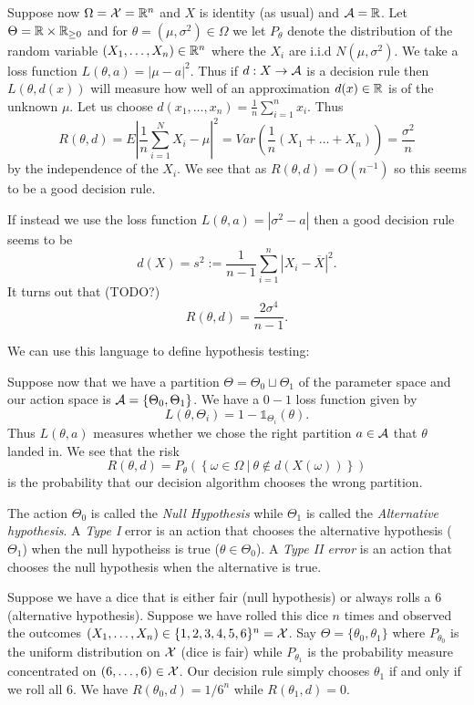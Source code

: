\documentclass[twoside, a4paper, 10pt]{amsart}
\begin{document}
\begin{eg} Suppose now $\Omega = \mathcal{X} = \mathbb{R}^n$ and $X$ is identity (as usual) and $\mathcal{A} = \mathbb{R}$. Let $\Theta = \mathbb{R} \times \mathbb{R}_{\geq 0}$ and for $\theta = (\mu, \sigma^2) \in \Omega$ we let $P_{\theta}$ denote the distribution of the random variable $(X_1, \ldots, X_n) \in \mathbb{R}^n$ where the $X_i$ are i.i.d $N(\mu, \sigma^2)$. We take a loss function $L(\theta, a) = |\mu - a|^2$. Thus if $d:X \to \mathcal{A}$ is a decision rule then $L(\theta, d(x))$ will measure how well of an approximation $d(x) \in \mathbb{R}$ is of the unknown $\mu$. Let us choose $d(x_1, \ldots, x_n) = \frac{1}{n} \sum_{i=1}^n x_i$. Thus $$R(\theta, d) = E |\frac{1}{n}\sum_{i=1}^N X_i - \mu|^2 = Var(\frac{1}{n}(X_1 + \ldots + X_n)) = \frac{\sigma^2}{n}$$ by the independence of the $X_i$. We see that as $R(\theta, d) = O(n^{-1})$ so this seems to be a good decision rule.

If instead we use the loss function $L(\theta, a) = |\sigma^2 - a|$ then a good decision rule seems to be $$d(X) = s^2 := \frac{1}{n-1} \sum_{i=1}^n |X_i - \overline{X}|^2.$$ It turns out that (TODO?) $$R(\theta, d) = \frac{2\sigma^4}{n-1}.$$

\end{eg} 

We can use this language to define hypothesis testing:

\begin{mydef}\label{def: intro hypothesis testing} Suppose now that we have a partition $\Theta = \Theta_0 \sqcup \Theta_1$ of the parameter space and our action space is $\mathcal{A} = \{ \Theta_0, \Theta_1\}$. We have a $0-1$ loss function given by $$L(\theta, \Theta_i) = 1 - \mathds{1}_{\Theta_i}(\theta).$$ Thus $L(\theta, a)$ measures whether we chose the right partition $a \in \mathcal{A}$ that $\theta$ landed in. We see that the risk $$R(\theta, d) = P_{\theta} (\left\{ \omega \in \Omega ~|~ \theta \notin d(X(\omega)) \right\} )$$ is the probability that our decision algorithm chooses the wrong partition.

The action $\Theta_0$ is called the \textit{Null Hypothesis} while $\Theta_1$ is called the \textit{Alternative hypothesis}. A \textit{Type I} error is an action that chooses the alternative hypothesis ($\Theta_1$) when the null hypotheiss is true ($\theta \in \Theta_0$). A \textit{Type II error} is an action that chooses the null hypothesis when the alternative is true.

\end{mydef}

\begin{eg}\label{eg: biased dice intro} Suppose we have a dice that is either fair (null hypothesis) or always rolls a 6 (alternative hypothesis). Suppose we have rolled this dice $n$ times and observed the outcomes $(X_1, \ldots, X_n) \in \{1,2,3,4,5,6\}^n = \mathcal{X}$. Say $\Theta = \{\theta_0, \theta_1\}$ where $P_{\theta_0}$ is the uniform distribution on $\mathcal{X}$ (dice is fair) while $P_{\theta_1}$ is the probability measure concentrated on $(6, \ldots, 6) \in \mathcal{X}$. Our decision rule simply chooses $\theta_1$ if and only if we roll all $6$. We have $R(\theta_0, d) = 1/6^n$ while $R(\theta_1,d) = 0$.

\end{eg}
\end{document}
